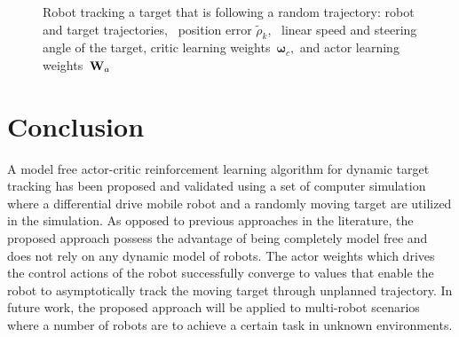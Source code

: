 \documentclass[conference]{IEEEtran}
\begin{document}
\begin{figure}[htbp]
  \caption[Robot tracking a target that is  following a random trajectory.]{Robot tracking a target that is  following a random trajectory:
   robot and target trajectories,~ position error $\tilde\rho_k$,~ linear speed and steering angle of the target,  critic learning weights~$\bm{\omega}_c,$ and  actor learning weights~${\bf W}_a$}%
  \label{fig:performanceRandom}%
\end{figure}


\section{Conclusion} \label{sec:conclusion}

A model free actor-critic reinforcement learning algorithm for dynamic target
tracking has been proposed and validated using a set of computer simulation
where a differential drive mobile robot and a randomly moving target are
utilized in the simulation. As opposed to previous approaches in the literature,
the proposed approach possess the advantage of being completely model free and
does not  rely on any dynamic model of robots. The actor weights which
drives the control actions of the robot successfully converge to values that
enable the robot to asymptotically track the moving target through unplanned
trajectory. In future work, the proposed approach will be applied to multi-robot scenarios
where a number of robots are to achieve a certain task in unknown environments.
 


	

\end{document}
